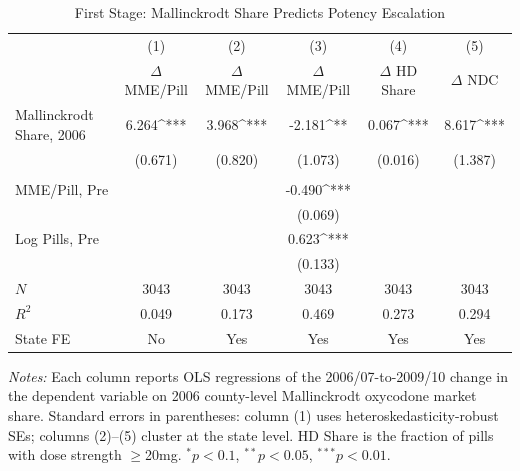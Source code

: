 \begin{table}[htbp]
\centering
\caption{First Stage: Mallinckrodt Share Predicts Potency Escalation}
\label{tab:first_stage}
\begin{adjustbox}{max width=\textwidth}
\begin{tabular}{lccccc}
\hline\hline
 & (1) & (2) & (3) & (4) & (5) \\
 & $\Delta$ MME/Pill & $\Delta$ MME/Pill & $\Delta$ MME/Pill & $\Delta$ HD Share & $\Delta$ NDC \\
\hline
Mallinckrodt Share, 2006 & 6.264^{***} & 3.968^{***} & -2.181^{**} & 0.067^{***} & 8.617^{***} \\
 & (0.671) & (0.820) & (1.073) & (0.016) & (1.387) \\
 & & & & & \\
MME/Pill, Pre & & & -0.490^{***} & & \\
 & & & (0.069) & & \\
Log Pills, Pre & & & 0.623^{***} & & \\
 & & & (0.133) & & \\
\hline
$N$ & 3043 & 3043 & 3043 & 3043 & 3043 \\
$R^2$ & 0.049 & 0.173 & 0.469 & 0.273 & 0.294 \\
State FE & No & Yes & Yes & Yes & Yes \\
\hline\hline
\end{tabular}
\end{adjustbox}
\par\vspace{0.5em}\parbox{\textwidth}{\small \textit{Notes:} Each column reports OLS regressions of the 2006/07-to-2009/10 change in the dependent variable on 2006 county-level Mallinckrodt oxycodone market share. Standard errors in parentheses: column (1) uses heteroskedasticity-robust SEs; columns (2)--(5) cluster at the state level. HD Share is the fraction of pills with dose strength $\geq$20mg. $^{*}p<0.1$, $^{**}p<0.05$, $^{***}p<0.01$.
}
\end{table}
